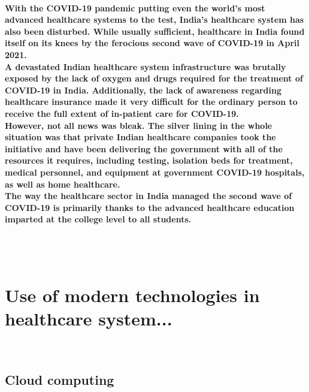 \documentclass[12pt]{article}
\begin{document}
    \paragraph{With the COVID-19 pandemic putting even the world’s most advanced healthcare systems to the test, India’s healthcare system has also been disturbed. While usually sufficient, healthcare in India found itself on its knees by the ferocious second wave of COVID-19 in April 2021.\\
    A devastated Indian healthcare system infrastructure was brutally exposed by the lack of oxygen and drugs required for the treatment of COVID-19 in India. Additionally, the lack of awareness regarding healthcare insurance made it very difficult for the ordinary person to receive the full extent of in-patient care for COVID-19.\\
    However, not all news was bleak. The silver lining in the whole situation was that private Indian healthcare companies took the initiative and have been delivering the government with all of the resources it requires, including testing, isolation beds for treatment, medical personnel, and equipment at government COVID-19 hospitals, as well as home healthcare.\\
    The way the healthcare sector in India managed the second wave of COVID-19 is primarily thanks to the advanced healthcare education imparted at the college level to all students.}
    \\\\\section{Use of modern technologies in healthcare system...}
    \\\subsection{Cloud computing}
\end{document}
